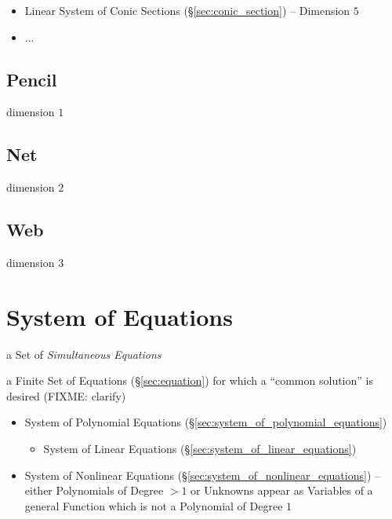 \begin{itemize}
  \item Linear System of Conic Sections (\S\ref{sec:conic_section}) --
    Dimension $5$
  \item ...
\end{itemize}



\subsection{Pencil}\label{sec:pencil}

dimension $1$



\subsection{Net}\label{sec:linear_divisor_net}

dimension $2$




\subsection{Web}\label{sec:web}

dimension $3$



\section{System of Equations}\label{sec:system_of_equations}

a Set of \emph{Simultaneous Equations}

a Finite Set of Equations (\S\ref{sec:equation}) for which a ``common
solution'' is desired (FIXME: clarify)

\begin{itemize}
  \item System of Polynomial Equations
    (\S\ref{sec:system_of_polynomial_equations})
  \begin{itemize}
    \item System of Linear Equations (\S\ref{sec:system_of_linear_equations})
  \end{itemize}
  \item System of Nonlinear Equations
    (\S\ref{sec:system_of_nonlinear_equations}) -- either Polynomials of Degree
    $>1$ or Unknowns appear as Variables of a general Function which is not a
    Polynomial of Degree $1$
\end{itemize}


